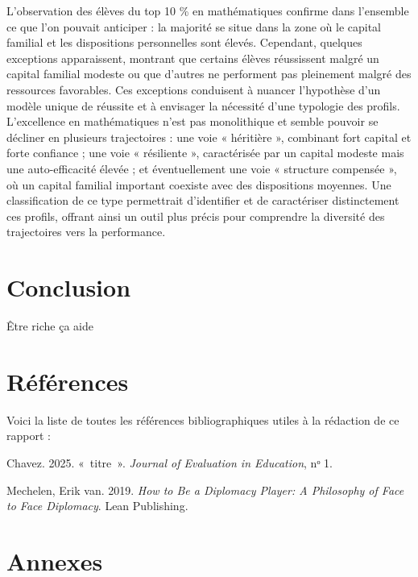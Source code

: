 \documentclass[
  french,
  11pt,
  a4paper,
]{report}
\newlength{\cslhangindent}
\newenvironment{CSLReferences}[2] %
 {\begin{list}{}{%
  \setlength{\itemindent}{0pt}
  \setlength{\leftmargin}{0pt}
  \setlength{\parsep}{0pt}
  \ifodd #1
   \setlength{\leftmargin}{\cslhangindent}
   \setlength{\itemindent}{-1\cslhangindent}
  \fi
  \setlength{\itemsep}{#2\baselineskip}}}
 {\end{list}}
\begin{document}
L'observation des élèves du top 10 \% en mathématiques confirme dans
l'ensemble ce que l'on pouvait anticiper : la majorité se situe dans la
zone où le capital familial et les dispositions personnelles sont
élevés. Cependant, quelques exceptions apparaissent, montrant que
certains élèves réussissent malgré un capital familial modeste ou que
d'autres ne performent pas pleinement malgré des ressources favorables.
Ces exceptions conduisent à nuancer l'hypothèse d'un modèle unique de
réussite et à envisager la nécessité d'une typologie des profils.
L'excellence en mathématiques n'est pas monolithique et semble pouvoir
se décliner en plusieurs trajectoires : une voie « héritière »,
combinant fort capital et forte confiance ; une voie « résiliente »,
caractérisée par un capital modeste mais une auto-efficacité élevée ; et
éventuellement une voie « structure compensée », où un capital familial
important coexiste avec des dispositions moyennes. Une classification de
ce type permettrait d'identifier et de caractériser distinctement ces
profils, offrant ainsi un outil plus précis pour comprendre la diversité
des trajectoires vers la performance.

\pagebreak

\chapter{Conclusion}\label{conclusion}

Être riche ça aide

\chapter{Références}\label{pagedesreferences}

Voici la liste de toutes les références bibliographiques utiles à la
rédaction de ce rapport :

\protect{}\label{refs}
\begin{CSLReferences}{1}{1}
Chavez. 2025. {«~titre~»}. \emph{Journal of Evaluation in Education}, nᵒ
1.

Mechelen, Erik van. 2019. \emph{How to Be a Diplomacy Player: A
Philosophy of Face to Face Diplomacy}. Lean Publishing.

\end{CSLReferences}

\chapter{Annexes}\label{pagesdannexes}
\end{document}
